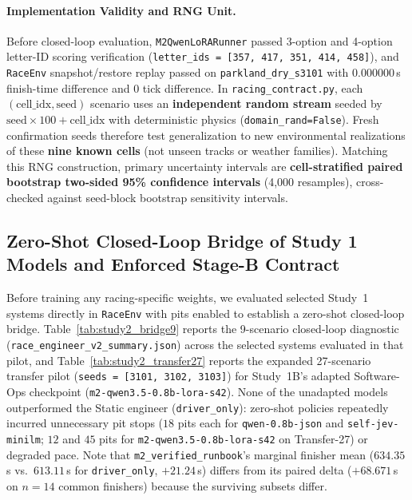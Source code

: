 \documentclass[11pt,a4paper]{article}
\begin{document}
\paragraph{Implementation Validity and RNG Unit.}
Before closed-loop evaluation, \texttt{M2QwenLoRARunner} passed 3-option and 4-option letter-ID scoring verification (\texttt{letter\_ids = [357, 417, 351, 414, 458]}), and \texttt{RaceEnv} snapshot/restore replay passed on \texttt{parkland\_dry\_s3101} with $0.000000$\,s finish-time difference and $0$ tick difference. In \texttt{racing\_contract.py}, each $(\text{cell\_idx}, \text{seed})$ scenario uses an \textbf{independent random stream} seeded by $\text{seed} \times 100 + \text{cell\_idx}$ with deterministic physics (\texttt{domain\_rand=False}). Fresh confirmation seeds therefore test generalization to new environmental realizations of these \textbf{nine known cells} (not unseen tracks or weather families). Matching this RNG construction, primary uncertainty intervals are \textbf{cell-stratified paired bootstrap two-sided 95\% confidence intervals} (4,000 resamples), cross-checked against seed-block bootstrap sensitivity intervals.

\subsection{Zero-Shot Closed-Loop Bridge of Study 1 Models and Enforced Stage-B Contract}

Before training any racing-specific weights, we evaluated selected Study~1 systems directly in \texttt{RaceEnv} with pits enabled to establish a zero-shot closed-loop bridge. Table~\ref{tab:study2_bridge9} reports the 9-scenario closed-loop diagnostic (\texttt{race\_engineer\_v2\_summary.json}) across the selected systems evaluated in that pilot, and Table~\ref{tab:study2_transfer27} reports the expanded 27-scenario transfer pilot (\texttt{seeds = [3101, 3102, 3103]}) for Study~1B's adapted Software-Ops checkpoint (\texttt{m2-qwen3.5-0.8b-lora-s42}). None of the unadapted models outperformed the Static engineer (\texttt{driver\_only}): zero-shot policies repeatedly incurred unnecessary pit stops ($18$ pits each for \texttt{qwen-0.8b-json} and \texttt{self-jev-minilm}; $12$ and $45$ pits for \texttt{m2-qwen3.5-0.8b-lora-s42} on Transfer-27) or degraded pace. Note that \texttt{m2\_verified\_runbook}'s marginal finisher mean ($634.35$\,s vs.\ $613.11$\,s for \texttt{driver\_only}, $+21.24$\,s) differs from its paired delta ($+68.671$\,s on $n=14$ common finishers) because the surviving subsets differ.
\end{document}
